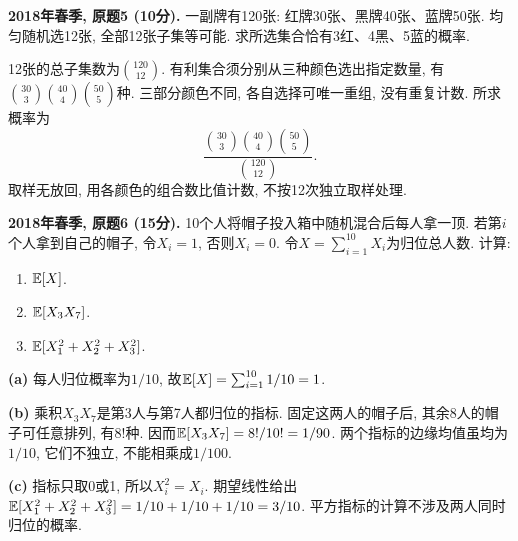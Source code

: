 \begin{exercise}\label{ex:m1-2018s-q5}
\textbf{2018年春季, 原题5 (10分).} 一副牌有120张: 红牌30张、黑牌40张、蓝牌50张. 均匀随机选12张, 全部12张子集等可能. 求所选集合恰有3红、4黑、5蓝的概率.
\end{exercise}
\begin{solution}
\label{sol:m1-2018s-q5}
12张的总子集数为$\binom{120}{12}$. 有利集合须分别从三种颜色选出指定数量, 有$\binom{30}{3}\binom{40}{4}\binom{50}{5}$种. 三部分颜色不同, 各自选择可唯一重组, 没有重复计数. 所求概率为
\[
\frac{\binom{30}{3}\binom{40}{4}\binom{50}{5}}{\binom{120}{12}}.
\]
取样无放回, 用各颜色的组合数比值计数, 不按12次独立取样处理.
\end{solution}

\begin{exercise}\label{ex:m1-2018s-q6}
\textbf{2018年春季, 原题6 (15分).} 10个人将帽子投入箱中随机混合后每人拿一顶. 若第$i$个人拿到自己的帽子, 令$X_i=1$, 否则$X_i=0$. 令$X=\sum_{i=1}^{10}X_i$为归位总人数. 计算:
\begin{enumerate}\item[(a)]\label{ex:m1-2018s-q6-a} $\mathbb E[X]$.\item[(b)]\label{ex:m1-2018s-q6-b} $\mathbb E[X_3X_7]$.\item[(c)]\label{ex:m1-2018s-q6-c} $\mathbb E[X_1^2+X_2^2+X_3^2]$.\end{enumerate}
\end{exercise}
\begin{solution}
\textbf{(a)}\label{sol:m1-2018s-q6-a} 每人归位概率为$1/10$, 故$\mathbb E[X]=\sum_{i=1}^{10}1/10=1$.

\textbf{(b)}\label{sol:m1-2018s-q6-b} 乘积$X_3X_7$是第3人与第7人都归位的指标. 固定这两人的帽子后, 其余8人的帽子可任意排列, 有$8!$种. 因而$\mathbb E[X_3X_7]=8!/10!=1/90$. 两个指标的边缘均值虽均为$1/10$, 它们不独立, 不能相乘成$1/100$.

\textbf{(c)}\label{sol:m1-2018s-q6-c} 指标只取0或1, 所以$X_i^2=X_i$. 期望线性给出$\mathbb E[X_1^2+X_2^2+X_3^2]=1/10+1/10+1/10=3/10$. 平方指标的计算不涉及两人同时归位的概率.
\end{solution}

